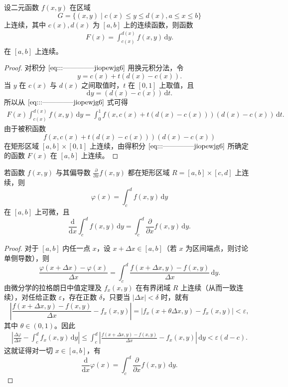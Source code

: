 \documentclass[../../main.tex]{subfiles}%
\begin{document}
\begin{theorem}[连续性]\label{theorem:含参量积分的连续性1}
设二元函数 \( f(x,y) \) 在区域
\[
G = \{ (x,y) \mid c(x) \leqslant y \leqslant d(x), a \leqslant x \leqslant b \}
\]
上连续，其中 \( c(x), d(x) \) 为 \( [a,b] \) 上的连续函数，则函数
\begin{align}
F(x) = \int_{c(x)}^{d(x)} f(x,y) \, \mathrm{d}y. \label{eq:::--------------jiopewjg6}
\end{align}
在 \( [a,b] \) 上连续。
\end{theorem}
\begin{proof}

对积分 \(\eqref{eq:::--------------jiopewjg6}\) 用换元积分法，令
\[
y = c(x) + t(d(x) - c(x)).
\]
当 \( y \) 在 \( c(x) \) 与 \( d(x) \) 之间取值时，\( t \) 在 \( [0,1] \) 上取值，且
\[
\mathrm{d}y = (d(x) - c(x)) \, \mathrm{d}t.
\]
所以从 \(\eqref{eq:::--------------jiopewjg6}\) 式可得
\begin{align*}
F(x)  \int_{c(x)}^{d(x)} f(x,y) \, \mathrm{d}y
= \int_{0}^{1} f(x,c(x) + t(d(x) - c(x))) (d(x) - c(x)) \, \mathrm{d}t.
\end{align*}
由于被积函数
\[
f(x,c(x) + t(d(x) - c(x))) (d(x) - c(x))
\]
在矩形区域 \( [a,b] \times [0,1] \) 上连续，由得积分 \(\eqref{eq:::--------------jiopewjg6}\) 所确定的函数 \( F(x) \) 在 \( [a,b] \) 上连续。

\end{proof}

\begin{theorem}[可微性]\label{theorem:含参量积分的可微性1}
若函数 \( f(x,y) \) 与其偏导数 \( \frac{\partial}{\partial x}f(x,y) \) 都在矩形区域 \( R = [a,b] \times [c,d] \) 上连续，则
\[
\varphi(x) = \int_{c}^{d} f(x,y) \, \mathrm{d}y
\]
在 \( [a,b] \) 上可微，且
\[
\frac{\mathrm{d}}{\mathrm{d}x} \int_{c}^{d} f(x,y) \, \mathrm{d}y = \int_{c}^{d} \frac{\partial}{\partial x} f(x,y) \, \mathrm{d}y.
\]
\end{theorem}
\begin{proof}

对于 \( [a,b] \) 内任一点 \( x \)，设 \( x + \Delta x \in [a,b] \)（若 \( x \) 为区间端点，则讨论单侧导数），则
\[
\frac{\varphi(x + \Delta x) - \varphi(x)}{\Delta x} = \int_{c}^{d} \frac{f(x + \Delta x,y) - f(x,y)}{\Delta x} \, \mathrm{d}y.
\]
由微分学的拉格朗日中值定理及 \( f_x(x,y) \) 在有界闭域 \( R \) 上连续（从而一致连续），对任给正数 \( \varepsilon \)，存在正数 \( \delta \)，只要当 \( |\Delta x| < \delta \) 时，就有
\[
\left| \frac{f(x + \Delta x,y) - f(x,y)}{\Delta x} - f_x(x,y) \right|
= |f_x(x + \theta \Delta x,y) - f_x(x,y)| < \varepsilon,
\]
其中 \( \theta \in (0,1) \)。因此
\begin{align*}
\left| \frac{\Delta \varphi}{\Delta x} - \int_{c}^{d} f_x(x,y) \, \mathrm{d}y \right|
\leqslant \int_{c}^{d} \left| \frac{f(x + \Delta x,y) - f(x,y)}{\Delta x} - f_x(x,y) \right| \, \mathrm{d}y
< \varepsilon(d - c).
\end{align*}
这就证得对一切 \( x \in [a,b] \)，有
\[
\frac{\mathrm{d}}{\mathrm{d}x} \varphi(x) = \int_{c}^{d} \frac{\partial}{\partial x} f(x,y) \, \mathrm{d}y.
\]

\end{proof}
\end{document}

